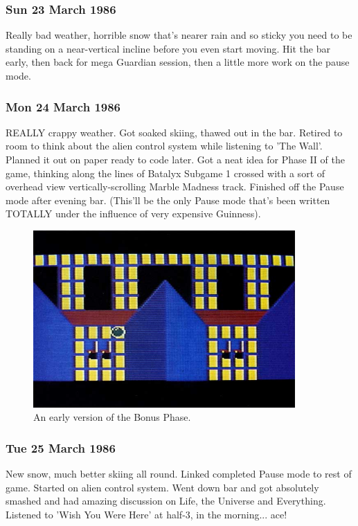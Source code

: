 \subsubsection{Sun 23 March 1986}
Really bad weather, horrible snow that's nearer rain and so sticky you need to be standing on a near-vertical incline before you even start moving. Hit the bar early, then back for mega Guardian session, then a little more work on the pause mode.

\subsubsection{Mon 24 March 1986}
REALLY crappy weather. Got soaked skiing, thawed out in the bar. Retired to room to think about the alien control system while listening to 'The Wall'. Planned it out on paper ready to code later. Got a neat idea for Phase II of the game, thinking along the lines of Batalyx Subgame 1 crossed with a sort of overhead view vertically-scrolling Marble Madness track. Finished off the Pause mode after evening bar. (This'll be the only Pause mode that's been written TOTALLY under the influence of very expensive Guinness).

\begin{figure}[H]
    \centering
      \includegraphics[width=10cm]{src/diary/zzap15_pic1.jpg}%
\caption{An early version of the Bonus Phase.}
\end{figure}

\subsubsection{Tue 25 March 1986}
New snow, much better skiing all round. Linked completed Pause mode to rest of game. Started on alien control system. Went down bar and got absolutely smashed and had amazing discussion on Life, the Universe and Everything. Listened to 'Wish You Were Here' at half-3, in the morning... ace!


